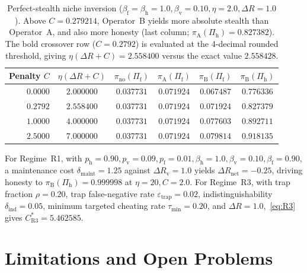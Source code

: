 \documentclass[11pt,a4paper]{article}
\begin{document}
\begin{table}[ht]
\centering
\caption{Perfect-stealth niche inversion ($\beta_{\mathrm{f}} = \beta_{\mathrm{h}} = 1.0, \beta_{\mathrm{v}} = 0.10, \eta = 2.0, \Delta R = 1.0$). Above $C = 0.279214$, Operator~B yields more absolute stealth than Operator~A, and also more honesty (last column; $\pi_{\mathrm{A}}(\Pi_{\mathrm{h}}) = 0.827382$). The bold crossover row ($C = 0.2792$) is evaluated at the 4-decimal rounded threshold, giving $\eta(\Delta R + C) = 2.558400$ versus the exact value $2.558428$.}
\label{tab:niche}
\small
\begin{tabular}{@{}rccccc@{}}
\toprule
Penalty $C$ & $\eta(\Delta R + C)$ & $\pi_{\mathrm{no}}(\Pi_{\mathrm{f}})$ & $\pi_{\mathrm{A}}(\Pi_{\mathrm{f}})$ & $\pi_{\mathrm{B}}(\Pi_{\mathrm{f}})$ & $\pi_{\mathrm{B}}(\Pi_{\mathrm{h}})$ \\
\midrule
$0.0000$ & $2.000000$ & $0.037731$ & $0.071924$ & $0.067487$ & $0.776336$ \\
$\mathbf{0.2792}$ & $\mathbf{2.558400}$ & $0.037731$ & $\mathbf{0.071924}$ & $\mathbf{0.071924}$ & $0.827379$ \\
$1.0000$ & $4.000000$ & $0.037731$ & $0.071924$ & $0.077603$ & $0.892711$ \\
$2.5000$ & $7.000000$ & $0.037731$ & $0.071924$ & $\mathbf{0.079814}$ & $0.918135$ \\
\bottomrule
\end{tabular}
\end{table}

For Regime~R1, with $p_{\mathrm{h}} = 0.90, p_{\mathrm{v}} = 0.09, p_{\mathrm{f}} = 0.01, \beta_{\mathrm{h}} = 1.0, \beta_{\mathrm{v}} = 0.10, \beta_{\mathrm{f}} = 0.90$, a maintenance cost $\delta_{\mathrm{maint}} = 1.25$ against $\Delta R_{\mathrm{v}} = 1.0$ yields $\Delta R_{\mathrm{net}} = -0.25$, driving honesty to $\pi_{\mathrm{B}}(\Pi_{\mathrm{h}}) = 0.999998$ at $\eta = 20, C = 2.0$. For Regime~R3, with trap fraction $\rho = 0.20$, trap false-negative rate $\varepsilon_{\mathrm{trap}} = 0.02$, indistinguishability $\delta_{\mathrm{ind}} = 0.05$, minimum targeted cheating rate $\tau_{\min} = 0.20$, and $\Delta R = 1.0$,~\eqref{eq:R3} gives $C_{\mathrm{R3}}^* = 5.462585$.

\section{Limitations and Open Problems}
\end{document}
